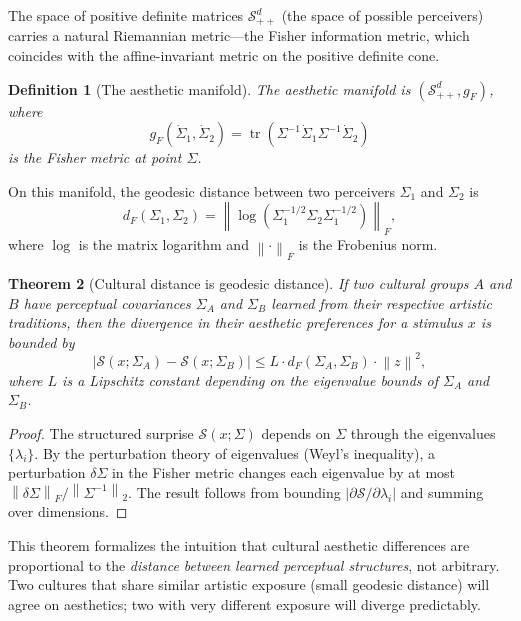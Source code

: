 \documentclass[journal]{IEEEtran}
\newtheorem{theorem}{Theorem}
\newtheorem{definition}[theorem]{Definition}
\newcommand{\norm}[1]{\left\lVert #1 \right\rVert}
\DeclareMathOperator{\tr}{tr}
\begin{document}
The space of positive definite matrices $\mathcal{S}_{++}^d$
(the space of possible perceivers) carries a natural Riemannian
metric---the Fisher information metric, which coincides with the
affine-invariant metric on the positive definite cone.

\begin{definition}[The aesthetic manifold]
The \emph{aesthetic manifold} is $(\mathcal{S}_{++}^d, g_F)$, where
\begin{equation}
    g_F(\dot{\Sigma}_1, \dot{\Sigma}_2) =
    \tr(\Sigma^{-1} \dot{\Sigma}_1 \Sigma^{-1} \dot{\Sigma}_2)
    \label{eq:fisher}
\end{equation}
is the Fisher metric at point $\Sigma$.
\end{definition}

On this manifold, the geodesic distance between two perceivers
$\Sigma_1$ and $\Sigma_2$ is
\begin{equation}
    d_F(\Sigma_1, \Sigma_2) = \norm{\log(\Sigma_1^{-1/2}
    \Sigma_2 \Sigma_1^{-1/2})}_F,
\end{equation}
where $\log$ is the matrix logarithm and $\norm{\cdot}_F$ is the
Frobenius norm.

\begin{theorem}[Cultural distance is geodesic distance]
\label{thm:cultural}
If two cultural groups $A$ and $B$ have perceptual covariances
$\Sigma_A$ and $\Sigma_B$ learned from their respective artistic
traditions, then the divergence in their aesthetic preferences
for a stimulus $x$ is bounded by
\begin{equation}
    |\mathcal{S}(x; \Sigma_A) - \mathcal{S}(x; \Sigma_B)|
    \leq L \cdot d_F(\Sigma_A, \Sigma_B) \cdot \norm{z}^2,
\end{equation}
where $L$ is a Lipschitz constant depending on the eigenvalue bounds
of $\Sigma_A$ and $\Sigma_B$.
\end{theorem}

\begin{proof}
The structured surprise $\mathcal{S}(x; \Sigma)$ depends on $\Sigma$
through the eigenvalues $\{\lambda_i\}$.  By the perturbation theory
of eigenvalues (Weyl's inequality), a perturbation $\delta\Sigma$
in the Fisher metric changes each eigenvalue by at most
$\norm{\delta\Sigma}_F / \norm{\Sigma^{-1}}_2$.  The result follows
from bounding $|\partial \mathcal{S} / \partial \lambda_i|$ and
summing over dimensions.
\end{proof}

This theorem formalizes the intuition that cultural aesthetic
differences are proportional to the \emph{distance between
learned perceptual structures}, not arbitrary.  Two cultures that
share similar artistic exposure (small geodesic distance) will
agree on aesthetics; two with very different exposure will diverge
predictably.
\end{document}
